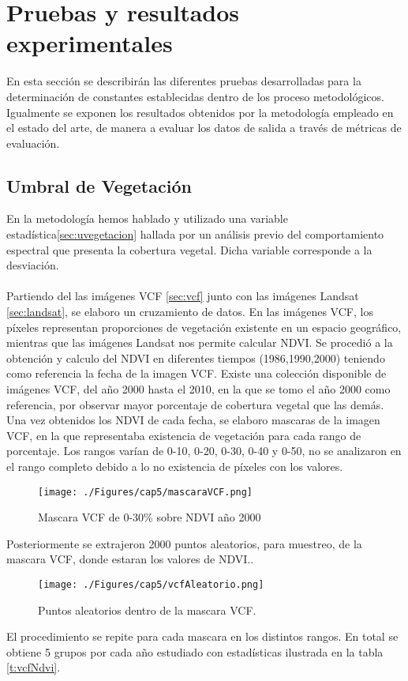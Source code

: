 \section{Pruebas y resultados experimentales}
En esta secci\'on se describir\'an las diferentes pruebas desarrolladas para la determinaci\'on de constantes establecidas dentro de los proceso metodol\'ogicos. Igualmente se exponen los resultados obtenidos por la metodolog\'ia empleado en el estado del arte, de manera a evaluar los datos de salida a trav\'es de m\'etricas de evaluaci\'on.
\subsection{Umbral de Vegetaci\'on} 
En la metodolog\'ia hemos hablado y utilizado una variable estad\'istica\ref{sec:uvegetacion} hallada por un an\'alisis previo del comportamiento espectral que presenta la cobertura vegetal. Dicha variable corresponde a la desviaci\'on.\\~\\
Partiendo del las im\'agenes VCF \ref{sec:vcf} junto con las im\'agenes Landsat \ref{sec:landsat}, se elaboro un cruzamiento de datos. En las im\'agenes VCF, los p\'ixeles representan proporciones de vegetaci\'on existente en un espacio geogr\'afico, mientras que las im\'agenes Landsat nos permite calcular NDVI. Se procedi\'o a la obtenci\'on y calculo del NDVI en diferentes tiempos (1986,1990,2000) teniendo como referencia la fecha de la imagen VCF. Existe una colecci\'on disponible de im\'agenes VCF, del a\~{n}o 2000 hasta el 2010, en la que se tomo el a\~{n}o 2000 como referencia, por observar mayor porcentaje de cobertura vegetal que las dem\'as. Una vez obtenidos los NDVI de cada fecha, se elaboro mascaras de la imagen VCF, en la que representaba existencia de vegetaci\'on para cada rango de porcentaje. Los rangos var\'ian de 0-10, 0-20, 0-30, 0-40 y 0-50, no se analizaron en el rango completo debido a lo no existencia de p\'ixeles con los valores.
\begin{figure}[H]
	\centering
	\texttt{[image: ./Figures/cap5/mascaraVCF.png]}
	\caption{Mascara VCF de 0-30\% sobre NDVI a\~{n}o 2000}
	\label{fig:mascVCf}
\end{figure}
Posteriormente se extrajeron 2000 puntos aleatorios, para muestreo, de la mascara VCF, donde estaran los valores de NDVI..
\begin{figure}[H]
	\centering
	\texttt{[image: ./Figures/cap5/vcfAleatorio.png]}
	\caption{Puntos aleatorios dentro de la mascara VCF.}
	\label{fig:aleatorioVCf}
\end{figure}
El procedimiento se repite para cada mascara en los distintos rangos. En total se obtiene 5 grupos por cada a\~{n}o estudiado con estad\'isticas ilustrada en la tabla \ref{t:vcfNdvi}.

